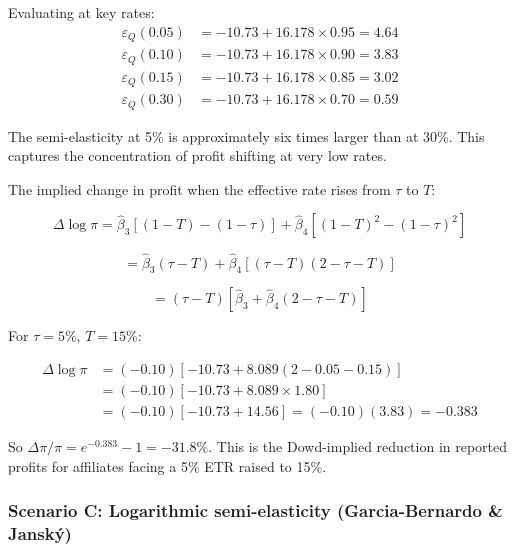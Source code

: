 \documentclass[11pt,a4paper]{article}
\begin{document}
Evaluating at key rates:
\begin{align}
\varepsilon_Q(0.05) &= -10.73 + 16.178 \times 0.95 = 4.64 \label{eq:dowd_5pct}\\
\varepsilon_Q(0.10) &= -10.73 + 16.178 \times 0.90 = 3.83 \\
\varepsilon_Q(0.15) &= -10.73 + 16.178 \times 0.85 = 3.02 \\
\varepsilon_Q(0.30) &= -10.73 + 16.178 \times 0.70 = 0.59 \label{eq:dowd_30pct}
\end{align}

The semi-elasticity at 5\% is approximately six times larger than at 30\%. This captures the concentration of profit shifting at very low rates.

The implied change in profit when the effective rate rises from $\tau$ to $T$:

\begin{equation}\label{eq:dowd_response}
\Delta \log \pi = \hat{\beta}_3\left[(1-T) - (1-\tau)\right] + \hat{\beta}_4\left[(1-T)^2 - (1-\tau)^2\right]
\end{equation}

\begin{equation}\label{eq:dowd_response_expanded}
= \hat{\beta}_3(\tau - T) + \hat{\beta}_4\left[(\tau - T)(2 - \tau - T)\right]
\end{equation}

\begin{equation}\label{eq:dowd_response_factored}
= (\tau - T)\left[\hat{\beta}_3 + \hat{\beta}_4(2 - \tau - T)\right]
\end{equation}

For $\tau = 5\%$, $T = 15\%$:

\begin{align}
\Delta \log \pi &= (-0.10)\left[-10.73 + 8.089(2 - 0.05 - 0.15)\right] \nonumber\\
&= (-0.10)\left[-10.73 + 8.089 \times 1.80\right] \nonumber\\
&= (-0.10)\left[-10.73 + 14.56\right] = (-0.10)(3.83) = -0.383
\end{align}

So $\Delta\pi/\pi = e^{-0.383} - 1 = -31.8\%$. This is the Dowd-implied reduction in reported profits for affiliates facing a 5\% ETR raised to 15\%.

\subsubsection{Scenario C: Logarithmic semi-elasticity (Garcia-Bernardo \& Janský)}
\end{document}
